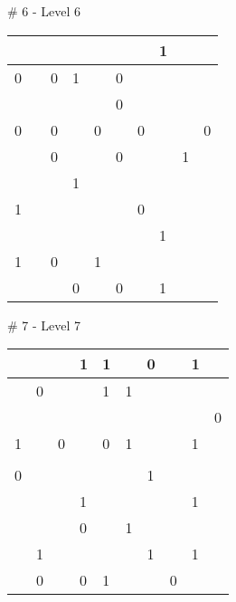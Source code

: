 \medskip

\# 6 - Level 6 \newline
\begin{tabular}{|m{\collen}|m{\collen}|m{\collen}|m{\collen}|m{\collen}|m{\collen}|m{\collen}|m{\collen}|m{\collen}|m{\collen}|}
\hline
    &   &   &   &   &   &   & 1 &   &   \\
\hline
  0 &   & 0 & 1 &   & 0 &   &   &   &   \\
\hline
    &   &   &   &   & 0 &   &   &   &   \\
\hline
  0 &   & 0 &   & 0 &   & 0 &   &   & 0 \\
\hline
    &   & 0 &   &   & 0 &   &   & 1 &   \\
\hline
    &   &   & 1 &   &   &   &   &   &   \\
\hline
  1 &   &   &   &   &   & 0 &   &   &   \\
\hline
    &   &   &   &   &   &   & 1 &   &   \\
\hline
  1 &   & 0 &   & 1 &   &   &   &   &   \\
\hline
    &   &   & 0 &   & 0 &   & 1 &   &   \\
\hline
\end{tabular}


\medskip

\# 7 - Level 7 \newline
\begin{tabular}{|m{\collen}|m{\collen}|m{\collen}|m{\collen}|m{\collen}|m{\collen}|m{\collen}|m{\collen}|m{\collen}|m{\collen}|}
\hline
    &   &   & 1 & 1 &   & 0 &   & 1 &   \\
\hline
    & 0 &   &   & 1 & 1 &   &   &   &   \\
\hline
    &   &   &   &   &   &   &   &   & 0 \\
\hline
  1 &   & 0 &   & 0 & 1 &   &   & 1 &   \\
\hline
    &   &   &   &   &   &   &   &   &   \\
\hline
  0 &   &   &   &   &   & 1 &   &   &   \\
\hline
    &   &   & 1 &   &   &   &   & 1 &   \\
\hline
    &   &   & 0 &   & 1 &   &   &   &   \\
\hline
    & 1 &   &   &   &   & 1 &   & 1 &   \\
\hline
    & 0 &   & 0 & 1 &   &   & 0 &   &   \\
\hline
\end{tabular}


\medskip

